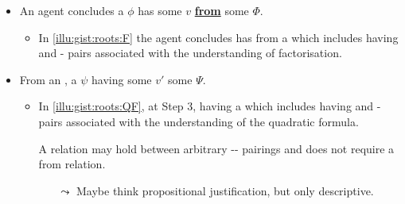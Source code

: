 \documentclass[10pt]{article}
\newcommand{\hand}{\ding{43}}
\begin{document}
\begin{note}
  \begin{itemize}
  \item
    An agent concludes a  \(\phi\) has some  \(v\) \underline{\textbf{from}} some \pool{} \(\Phi\).
    \begin{itemize}
    \item
      In \autoref{illu:gist:roots:F} the agent concludes \propI{\rootsCon{}} has \val{}  from a \pool{} which includes \propM{\rootsConEq{}} having   and - pairs associated with the \agents{} understanding of factorisation.
    \end{itemize}
  \item
    From an \agpe{}, a  \(\psi\) having some  \(v'\) \underline{\textbf{\fof{}}} some \pool{} \(\Psi\).
    \begin{itemize}
    \item
      In \autoref{illu:gist:roots:QF}, at Step 3, \propI{\rootsCon{}} having \val{}  \fof{} a \pool{} which includes \propM{\rootsConEq{}} having   and - pairs associated with the \agents{} understanding of the quadratic formula.
    \end{itemize}
    \begin{itemize}
    \item[\hand]
      A \fof{} relation may hold between arbitrary -- pairings and does not require a from relation.
      \begin{itemize}
      \item[\(\leadsto\)]
        Maybe think propositional justification, but only descriptive.
      \end{itemize}
    \end{itemize}
  \end{itemize}
\end{note}

\begin{comment}
  Relative to an \eiw{} agent concludes.

  From, and \fof{}.
  Coincide.
  However, \fofr{} are more general.
  With respect to \scen{1}, two from relations, only hold relative to the \scen{0}.
  Still, the \fofr{} relation may hold in both \scen{1}.
  I.e.\ agent concluded by factorisation, but had the option to use the quadratic formula.
  For additional examples, consider practice problems.
  If you've been learning the basics of factorisation, then \fofr{} should (hopefully) hold for practice problems.
\end{comment}
\end{document}
